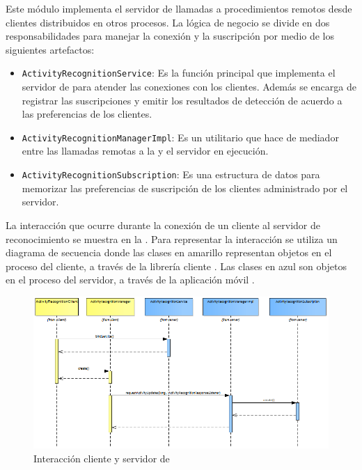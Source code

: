 Este módulo implementa el servidor de llamadas a procedimientos remotos
desde clientes distribuidos en otros procesos. La lógica de negocio
se divide en dos responsabilidades para manejar la conexión y la suscripción
por medio de los siguientes artefactos:
\begin{itemize}
\item \texttt{\small{}ActivityRecognitionService}: Es la función principal
que implementa el servidor  de \emph{ }para
atender las conexiones con los clientes. Además se encarga de registrar
las suscripciones y emitir los resultados de detección de acuerdo
a las preferencias de los clientes. 
\item \texttt{\small{}ActivityRecognitionManagerImpl}: Es un utilitario
que hace de mediador entre las llamadas remotas a la  y
el servidor en ejecución.
\item \texttt{\small{}ActivityRecognitionSubscription}: Es una estructura
de datos para memorizar las preferencias de suscripción de los clientes
administrado por el servidor.
\end{itemize}
La interacción que ocurre durante la conexión de un cliente al servidor
de reconocimiento se muestra en la . Para
representar la interacción se utiliza un diagrama de secuencia 
donde las clases en amarillo representan objetos en el proceso del
cliente, a través de la librería cliente \emph{}.
Las clases en azul son objetos en el proceso del servidor, a través
de la aplicación móvil \emph{}.

\begin{figure}[H]
\begin{centering}
\includegraphics[width=1\columnwidth]{capitulo-5/graphics/service_subs}
\par\end{centering}
\caption[Interacción cliente y servidor de HARDroid]{\label{fig5:service-subs}Interacción cliente y servidor de }
\end{figure}

